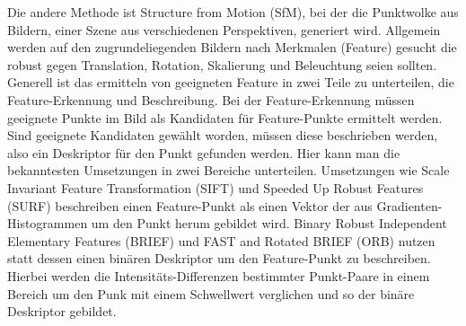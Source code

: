 \documentclass[12pt,titlepage, twoside]{article}
\begin{document}
Die andere Methode ist Structure from Motion (SfM), bei der die Punktwolke aus Bildern, einer Szene aus verschiedenen Perspektiven, generiert wird. 
Allgemein werden auf den zugrundeliegenden Bildern nach Merkmalen (Feature) gesucht die robust gegen Translation, Rotation, Skalierung und Beleuchtung seien sollten. 
Generell ist das ermitteln von geeigneten Feature in zwei Teile zu unterteilen, die Feature-Erkennung und Beschreibung. 
Bei der Feature-Erkennung müssen geeignete Punkte im Bild als Kandidaten für Feature-Punkte ermittelt werden. 
Sind geeignete Kandidaten gewählt worden, müssen diese beschrieben werden, also ein Deskriptor für den Punkt gefunden werden. Hier kann man die bekanntesten Umsetzungen in zwei Bereiche unterteilen. 
Umsetzungen wie Scale Invariant Feature Transformation (SIFT) \cite{Sift} und Speeded Up Robust Features (SURF) \cite{SURF} beschreiben einen Feature-Punkt als einen Vektor der aus Gradienten-Histogrammen um den Punkt herum gebildet wird.
Binary Robust Independent Elementary Features (BRIEF) \cite{BRIEF} und FAST and Rotated BRIEF (ORB) \cite{ORB} nutzen statt dessen einen binären Deskriptor um den Feature-Punkt zu beschreiben. 
Hierbei werden die Intensitäts-Differenzen bestimmter Punkt-Paare in einem Bereich um den Punk mit einem Schwellwert verglichen und so der binäre Deskriptor gebildet.
\end{document}
